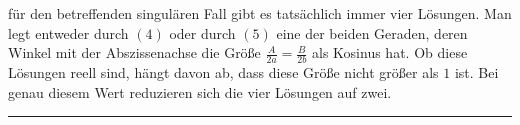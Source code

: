 %
für den betreffenden singulären Fall gibt es tatsächlich immer vier Lösungen. Man legt entweder durch \((4)\) oder durch \((5)\) eine der beiden Geraden, deren Winkel mit der Abszissenachse die Größe \(\frac A{2a}=\frac B{2b}\) als Kosinus hat. Ob diese Lösungen reell sind, hängt davon ab, dass diese Größe nicht größer als \(1\) ist. Bei genau diesem Wert reduzieren sich die vier Lösungen auf zwei.
\par\bigskip\begin{center}\rule{.16\textwidth}{.3pt}\end{center}
